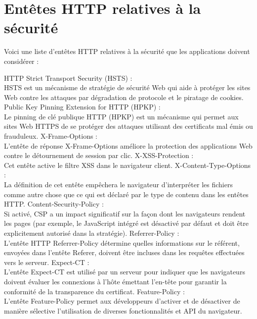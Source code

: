 \section*{Entêtes HTTP relatives à la sécurité}
Voici une liste d'entêtes HTTP relatives à la sécurité que les applications doivent considérer :
\begin{itemize}
	\itemcheck HTTP Strict Transport Security (HSTS) : \\
	HSTS est un mécanisme de stratégie de sécurité Web qui aide à protéger les sites Web contre les attaques par dégradation de protocole et le piratage de cookies.
	\itemcheck Public Key Pinning Extension for HTTP (HPKP) : \\
	Le pinning de clé publique HTTP (HPKP) est un mécanisme qui permet aux sites Web HTTPS de se protéger des attaques utilisant des certificats mal émis ou frauduleux.
	\itemcheck X-Frame-Options : \\
	L'entête de réponse X-Frame-Options améliore la protection des applications Web contre le détournement de session par clic.
	\itemcheck X-XSS-Protection : \\
	Cet entête active le filtre XSS dans le navigateur client.
	\itemcheck X-Content-Type-Options : \\
	La définition de cet entête empêchera le navigateur d'interpréter les fichiers comme autre chose que ce qui est déclaré par le type de contenu dans les entêtes HTTP.
	\itemcheck Content-Security-Policy : \\
	Si activé, CSP a un impact significatif sur la façon dont les navigateurs rendent les pages (par exemple, le JavaScript intégré est désactivé par défaut et doit être explicitement autorisé dans la stratégie).
	\itemcheck Referrer-Policy : \\
	L'entête HTTP Referrer-Policy détermine quelles informations sur le référent, envoyées dans l'entête Referer, doivent être incluses dans les requêtes effectuées vers le serveur.
	\itemcheck Expect-CT : \\
	L'entête Expect-CT est utilisé par un serveur pour indiquer que les navigateurs doivent évaluer les connexions à l'hôte émettant l'en-tête pour garantir la conformité de la transparence du certificat.
	\itemcheck Feature-Policy : \\
	L’entête Feature-Policy permet aux développeurs d’activer et de désactiver de manière sélective l’utilisation de diverses fonctionnalités et API du navigateur.
\end{itemize}

